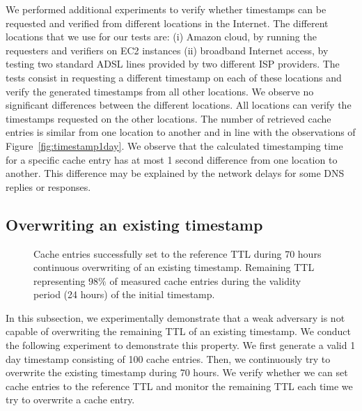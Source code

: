 We performed additional experiments to verify whether timestamps can be requested and verified from different locations in the Internet. The different locations that we use for our tests are: (i) Amazon cloud, by running the requesters and verifiers on EC2 instances (ii) broadband Internet access, by testing two standard ADSL lines provided by two different ISP providers.
The tests consist in requesting a different timestamp on each of these locations and verify the generated timestamps from all other locations. We observe no significant differences between the different locations. All locations can verify the timestamps requested on the other locations. The number of retrieved cache entries is similar from one location to another and in line with the observations of Figure~\ref{fig:timestamp1day}.
We observe that the calculated timestamping time for a specific cache entry has at most 1 second difference from one location to another. This difference may be explained by the network delays for some DNS replies or responses. 




\subsection{Overwriting an existing timestamp}
\label{sec:overwrite}

\begin{figure*}
\begin{center}
\caption{  Cache entries successfully set to the reference TTL during 70 hours continuous overwriting of an existing timestamp.  Remaining TTL representing $98\%$ of measured cache entries during the validity period (24 hours) of the initial timestamp. }
\end{center}
\end{figure*}

In this subsection, we experimentally demonstrate that a weak adversary is not capable of overwriting the remaining TTL of an existing timestamp.
We conduct the following experiment to demonstrate this property. We first generate a valid 1 day timestamp consisting of 100 cache entries. Then, we continuously try to overwrite the existing timestamp during 70 hours. We verify whether we can set cache entries to the reference TTL and monitor the remaining TTL each time we try to overwrite a cache entry.

